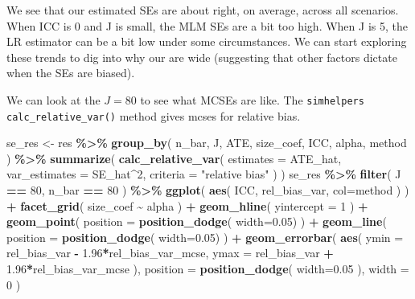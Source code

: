 \documentclass[
]{book}
\newenvironment{Shaded}{\begin{snugshade}}{\end{snugshade}}
\newcommand{\AttributeTok}[1]{\textcolor[rgb]{0.13,0.29,0.53}{#1}}
\newcommand{\DecValTok}[1]{\textcolor[rgb]{0.00,0.00,0.81}{#1}}
\newcommand{\FloatTok}[1]{\textcolor[rgb]{0.00,0.00,0.81}{#1}}
\newcommand{\FunctionTok}[1]{\textcolor[rgb]{0.13,0.29,0.53}{\textbf{#1}}}
\newcommand{\NormalTok}[1]{#1}
\newcommand{\OtherTok}[1]{\textcolor[rgb]{0.56,0.35,0.01}{#1}}
\newcommand{\SpecialCharTok}[1]{\textcolor[rgb]{0.81,0.36,0.00}{\textbf{#1}}}
\newcommand{\StringTok}[1]{\textcolor[rgb]{0.31,0.60,0.02}{#1}}
\begin{document}
We see that our estimated SEs are about right, on average, across all scenarios.
When ICC is 0 and J is small, the MLM SEs are a bit too high.
When J is 5, the LR estimator can be a bit low under some circumstances.
We can start exploring these trends to dig into why our are wide (suggesting that other factors dictate when the SEs are biased).

We can look at the \(J = 80\) to see what MCSEs are like.
The \texttt{simhelpers} \texttt{calc\_relative\_var()} method gives mcses for relative bias.

\begin{Shaded}
\begin{Highlighting}[]
\NormalTok{se\_res }\OtherTok{\textless{}{-}}\NormalTok{ res }\SpecialCharTok{\%\textgreater{}\%}
  \FunctionTok{group\_by}\NormalTok{( n\_bar, J, ATE, size\_coef, ICC, alpha, method ) }\SpecialCharTok{\%\textgreater{}\%}
  \FunctionTok{summarize}\NormalTok{( }\FunctionTok{calc\_relative\_var}\NormalTok{( }\AttributeTok{estimates =}\NormalTok{ ATE\_hat,}
                     \AttributeTok{var\_estimates =}\NormalTok{ SE\_hat}\SpecialCharTok{\^{}}\DecValTok{2}\NormalTok{,}
                     \AttributeTok{criteria =} \StringTok{"relative bias"}\NormalTok{ ) )}
\NormalTok{se\_res }\SpecialCharTok{\%\textgreater{}\%}
  \FunctionTok{filter}\NormalTok{( J }\SpecialCharTok{==} \DecValTok{80}\NormalTok{, n\_bar }\SpecialCharTok{==} \DecValTok{80}\NormalTok{ ) }\SpecialCharTok{\%\textgreater{}\%}
  \FunctionTok{ggplot}\NormalTok{( }\FunctionTok{aes}\NormalTok{( ICC, rel\_bias\_var, }\AttributeTok{col=}\NormalTok{method ) ) }\SpecialCharTok{+}
  \FunctionTok{facet\_grid}\NormalTok{( size\_coef }\SpecialCharTok{\textasciitilde{}}\NormalTok{ alpha  ) }\SpecialCharTok{+} 
  \FunctionTok{geom\_hline}\NormalTok{( }\AttributeTok{yintercept =} \DecValTok{1}\NormalTok{ ) }\SpecialCharTok{+}
  \FunctionTok{geom\_point}\NormalTok{( }\AttributeTok{position =} \FunctionTok{position\_dodge}\NormalTok{( }\AttributeTok{width=}\FloatTok{0.05}\NormalTok{) ) }\SpecialCharTok{+}
  \FunctionTok{geom\_line}\NormalTok{( }\AttributeTok{position =} \FunctionTok{position\_dodge}\NormalTok{( }\AttributeTok{width=}\FloatTok{0.05}\NormalTok{) ) }\SpecialCharTok{+}
  \FunctionTok{geom\_errorbar}\NormalTok{( }\FunctionTok{aes}\NormalTok{( }\AttributeTok{ymin =}\NormalTok{ rel\_bias\_var }\SpecialCharTok{{-}} \FloatTok{1.96}\SpecialCharTok{*}\NormalTok{rel\_bias\_var\_mcse,}
                      \AttributeTok{ymax =}\NormalTok{ rel\_bias\_var }\SpecialCharTok{+} \FloatTok{1.96}\SpecialCharTok{*}\NormalTok{rel\_bias\_var\_mcse ),}
                 \AttributeTok{position =} \FunctionTok{position\_dodge}\NormalTok{( }\AttributeTok{width=}\FloatTok{0.05}\NormalTok{ ),}
                 \AttributeTok{width =} \DecValTok{0}\NormalTok{ )}
\end{Highlighting}
\end{Shaded}
\end{document}
